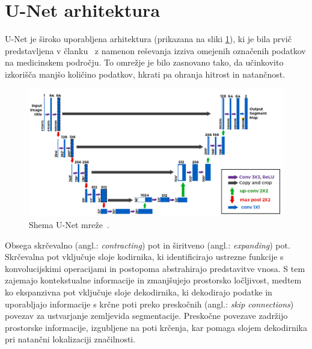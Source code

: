 \documentclass[12pt, a4paper]{article}
\begin{document}


\newpage

\newcommand{\refhmargin}{2.65cm}
\newgeometry{left=\refhmargin, right=\refhmargin, top=3.0cm, bottom=3.0cm}

\thispagestyle{referencestyle}
\printbibliography[title={Literatura}]



\newpage
\appendix
\section{U-Net arhitektura}
\label{sec:UNet}

U-Net je široko uporabljena arhitektura (prikazana na sliki \ref{fig:U-Net}), ki je bila prvič predstavljena v članku~\cite{biomedical} z namenon reševanja izziva omejenih označenih podatkov na medicinskem področju. To omrežje je bilo zasnovano tako, da učinkovito izkorišča manjšo količino podatkov, hkrati pa ohranja hitrost in natančnost.

\begin{figure}[htb!]
        \centering
        \includegraphics[width=0.7\linewidth]{Images/U-Net.jpg}
        \caption{Shema U-Net mreže~\cite{UNet}.}
        \label{fig:U-Net}
\end{figure}

Obsega skrčevalno (angl.: \textit{contracting}) pot in širitveno (angl.: \textit{expanding}) pot. Skrčevalna pot vključuje sloje kodirnika, ki identificirajo ustrezne funkcije s konvolucijskimi operacijami in postopoma abstrahirajo predstavitve vnosa. S tem zajemajo kontekstualne informacije in zmanjšujejo prostorsko ločljivost, medtem ko ekspanzivna pot vključuje sloje dekodirnika, ki dekodirajo podatke in uporabljajo informacije s krčne poti preko preskočnih (angl.: \textit{skip connections}) povezav za ustvarjanje zemljevida segmentacije. Preskočne povezave zadržijo prostorske informacije, izgubljene na poti krčenja, kar pomaga slojem dekodirnika pri natančni lokalizaciji značilnosti.
\end{document}
